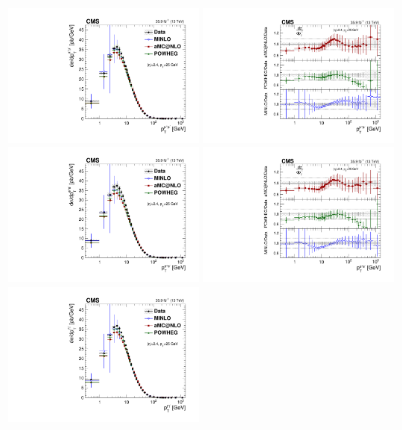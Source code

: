 \begin{figure}
	\centering
	\includegraphics[width=0.45\textwidth]{figures/zpt/zmm_shower.pdf}
	\includegraphics[width=0.45\textwidth]{figures/zpt/zmm_shower_ratio.pdf}
	\includegraphics[width=0.45\textwidth]{figures/zpt/zee_shower.pdf}
	\includegraphics[width=0.45\textwidth]{figures/zpt/zee_shower_ratio.pdf}
	\includegraphics[width=0.45\textwidth]{figures/zpt/zll_shower.pdf}

\end{figure}
